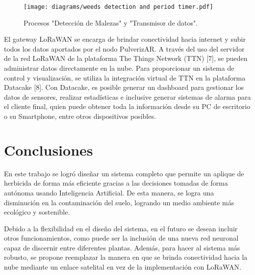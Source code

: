 \documentclass[conference]{IEEEtran}
\begin{document}
\begin{figure}[htbp]
\centerline{\texttt{[image: diagrams/weeds detection and period timer.pdf]}}
\caption{Procesos "Detección de Malezas" y "Transmisor de datos".}
\label{fig4}
\end{figure}





El gateway LoRaWAN se encarga de brindar conectividad hacia internet y subir todos los datos aportados por el nodo PulverizAR. A través del uso del servidor de la red LoRaWAN de la plataforma The Things Network (TTN) [7], se pueden administrar datos directamente en la nube. Para proporcionar un sistema de control y visualización, se utiliza la integración virtual de TTN en la plataforma Datacake [8]. Con Datacake, es posible generar un dashboard para gestionar los datos de sensores, realizar estadísticas e inclusive generar sistemas de alarma para el cliente final, quien puede obtener toda la información desde su PC de escritorio o su Smartphone, entre otros dispositivos posibles.


\section{Conclusiones}
En este trabajo se logró diseñar un sistema completo que permite un aplique de herbicida de forma más eficiente gracias a las decisiones tomadas de forma autónoma usando Inteligencia Artificial. De esta manera, se logra una disminución en la contaminación del suelo, logrando un medio ambiente más ecológico y sostenible. 

Debido a la flexibilidad en el diseño del sistema, en el futuro se desean incluir otros funcionamientos, como puede ser la inclusión de una nueva red neuronal capaz de discernir entre diferentes plantas. Además, para hacer al sistema más robusto, se propone reemplazar la manera en que se brinda conectividad hacia la nube mediante un enlace satelital en vez de la implementación con LoRaWAN. 
\end{document}
